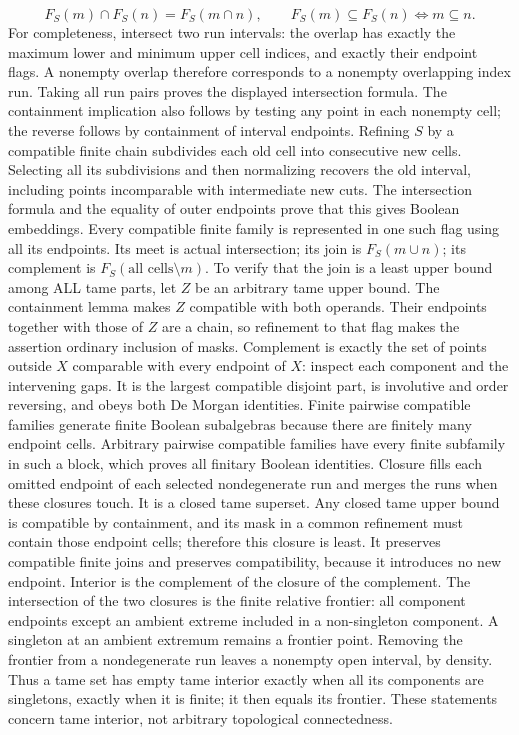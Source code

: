 \[
 F_S(m)\cap F_S(n)=F_S(m\cap n),\qquad
 F_S(m)\subseteq F_S(n)\Longleftrightarrow m\subseteq n.
\]
For completeness, intersect two run intervals: the overlap has exactly the maximum lower and minimum upper cell indices, and exactly their endpoint flags. A nonempty overlap therefore corresponds to a nonempty overlapping index run. Taking all run pairs proves the displayed intersection formula. The containment implication also follows by testing any point in each nonempty cell; the reverse follows by containment of interval endpoints.
Refining $S$ by a compatible finite chain subdivides each old cell into consecutive new cells. Selecting all its subdivisions and then normalizing recovers the old interval, including points incomparable with intermediate new cuts. The intersection formula and the equality of outer endpoints prove that this gives Boolean embeddings. Every compatible finite family is represented in one such flag using all its endpoints. Its meet is actual intersection; its join is $F_S(m\cup n)$; its complement is $F_S(\text{all cells}\setminus m)$. To verify that the join is a least upper bound among ALL tame parts, let $Z$ be an arbitrary tame upper bound. The containment lemma makes $Z$ compatible with both operands. Their endpoints together with those of $Z$ are a chain, so refinement to that flag makes the assertion ordinary inclusion of masks. Complement is exactly the set of points outside $X$ comparable with every endpoint of $X$: inspect each component and the intervening gaps. It is the largest compatible disjoint part, is involutive and order reversing, and obeys both De Morgan identities. Finite pairwise compatible families generate finite Boolean subalgebras because there are finitely many endpoint cells. Arbitrary pairwise compatible families have every finite subfamily in such a block, which proves all finitary Boolean identities.
Closure fills each omitted endpoint of each selected nondegenerate run and merges the runs when these closures touch. It is a closed tame superset. Any closed tame upper bound is compatible by containment, and its mask in a common refinement must contain those endpoint cells; therefore this closure is least. It preserves compatible finite joins and preserves compatibility, because it introduces no new endpoint. Interior is the complement of the closure of the complement. The intersection of the two closures is the finite relative frontier: all component endpoints except an ambient extreme included in a non-singleton component. A singleton at an ambient extremum remains a frontier point. Removing the frontier from a nondegenerate run leaves a nonempty open interval, by density. Thus a tame set has empty tame interior exactly when all its components are singletons, exactly when it is finite; it then equals its frontier. These statements concern tame interior, not arbitrary topological connectedness.
